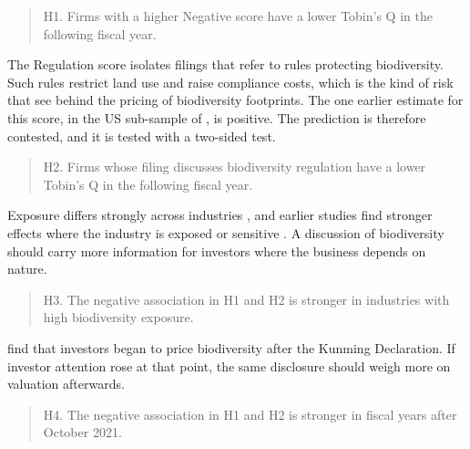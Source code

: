 \documentclass[12pt,a4paper]{article}
\begin{document}
\begin{quote}
H1. Firms with a higher Negative score have a lower Tobin's Q in the following fiscal year.
\end{quote}

The Regulation score isolates filings that refer to rules protecting biodiversity. Such rules restrict land use and raise compliance costs, which is the kind of risk that \citet{garel2024} see behind the pricing of biodiversity footprints. The one earlier estimate for this score, in the US sub-sample of \citet{cosma2025}, is positive. The prediction is therefore contested, and it is tested with a two-sided test.

\begin{quote}
H2. Firms whose filing discusses biodiversity regulation have a lower Tobin's Q in the following fiscal year.
\end{quote}

Exposure differs strongly across industries \citep{giglio2026}, and earlier studies find stronger effects where the industry is exposed or sensitive \citep{ahmad2024,bach2025}. A discussion of biodiversity should carry more information for investors where the business depends on nature.

\begin{quote}
H3. The negative association in H1 and H2 is stronger in industries with high biodiversity exposure.
\end{quote}

\citet{garel2024} find that investors began to price biodiversity after the Kunming Declaration. If investor attention rose at that point, the same disclosure should weigh more on valuation afterwards.

\begin{quote}
H4. The negative association in H1 and H2 is stronger in fiscal years after October 2021.
\end{quote}
\end{document}
